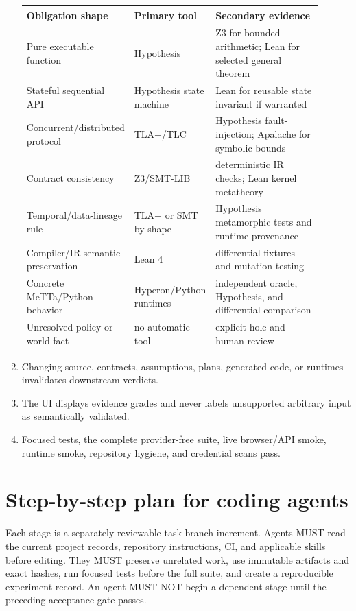 \documentclass[10pt]{article}
\begin{document}
\begin{enumerate}
\begin{longtable}{p{0.24\linewidth}p{0.19\linewidth}p{0.47\linewidth}}
\toprule
Obligation shape & Primary tool & Secondary evidence \\
\midrule
Pure executable function & Hypothesis & Z3 for bounded arithmetic; Lean for
selected general theorem \\
Stateful sequential API & Hypothesis state machine & Lean for reusable state
invariant if warranted \\
Concurrent/distributed protocol & TLA+/TLC & Hypothesis fault-injection;
Apalache for symbolic bounds \\
Contract consistency & Z3/SMT-LIB & deterministic IR checks; Lean kernel
metatheory \\
Temporal/data-lineage rule & TLA+ or SMT by shape & Hypothesis metamorphic
tests and runtime provenance \\
Compiler/IR semantic preservation & Lean 4 & differential fixtures and
mutation testing \\
Concrete MeTTa/Python behavior & Hyperon/Python runtimes & independent oracle,
Hypothesis, and differential comparison \\
Unresolved policy or world fact & no automatic tool & explicit hole and human
review \\
\bottomrule
\end{longtable}
\item Changing source, contracts, assumptions, plans, generated code, or
runtimes invalidates downstream verdicts.
\item The UI displays evidence grades and never labels unsupported arbitrary
input as semantically validated.
\item Focused tests, the complete provider-free suite, live browser/API smoke,
runtime smoke, repository hygiene, and credential scans pass.
\end{enumerate}

\section{Step-by-step plan for coding agents}

Each stage is a separately reviewable task-branch increment.  Agents MUST read
the current project records, repository instructions, CI, and applicable
skills before editing.  They MUST preserve unrelated work, use immutable
artifacts and exact hashes, run focused tests before the full suite, and create
a reproducible experiment record.  An agent MUST NOT begin a dependent stage
until the preceding acceptance gate passes.
\end{document}

